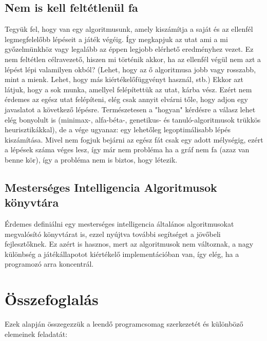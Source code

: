 \documentclass[twoside, a4paper, 12pt]{book}
\begin{document}
\subsection{Nem is kell feltétlenül fa}
Tegyük fel, hogy van egy algoritmusunk, amely kiszámítja a saját és az ellenfél legmegfelelőbb lépéseit a játék végéig. Így megkapjuk az utat ami a mi győzelmünkhöz vagy legalább az éppen legjobb elérhető eredményhez vezet. Ez nem feltétlen célravezető, hiszen mi történik akkor, ha az ellenfél végül nem azt a lépést lépi valamilyen okból? (Lehet, hogy az ő algoritmusa jobb vagy rosszabb, mint a mienk. Lehet, hogy más kiértékelőfüggvényt használ, stb.) Ekkor azt látjuk, hogy a sok munka, amellyel felépítettük az utat, kárba vész. Ezért nem érdemes az egész utat felépíteni, elég csak annyit elvárni tőle, hogy adjon egy javaslatot a következő lépésre. Természetesen a "hogyan" kérdésre a válasz lehet elég bonyolult is (minimax-, alfa-béta-, genetikus- és tanuló-algoritmusok trükkös heurisztikákkal), de a vége ugyanaz: egy lehetőleg legoptimálisabb lépés kiszámítása. Mivel nem fogjuk bejárni az egész fát csak egy adott mélységig, ezért a lépések száma véges lesz, így már nem probléma ha a gráf nem fa (azaz van benne kör), így a probléma nem is biztos, hogy létezik.

\subsection{Mesterséges Intelligencia Algoritmusok könyvtára}
Érdemes definiálni egy mesterséges intelligencia általános algoritmusokat megvalósító könyvtárat is, ezzel nyújtva további segítséget a jövőbeli fejlesztőknek. Ez azért is hasznos, mert az algoritmusok nem változnak, a nagy különbség a játékállapotot kiértékelő implementációban van, így elég, ha a programozó arra koncentrál.

\section{Összefoglalás}
Ezek alapján összegezzük a leendő programcsomag szerkezetét és különböző elemeinek feladatát:
\end{document}

